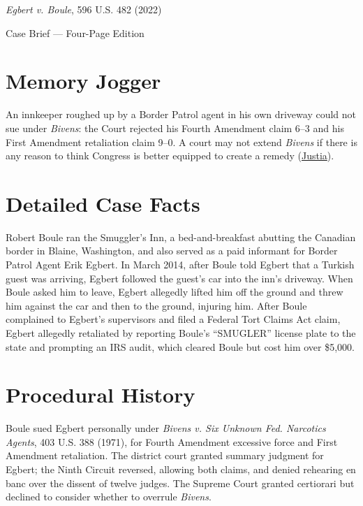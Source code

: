 \documentclass[12pt]{article}
\begin{document}
\begin{center}
{\LARGE \textit{Egbert v. Boule}, 596 U.S. 482 (2022)\par}
\vspace{0.8em}
{\large Case Brief --- Four-Page Edition\par}
\end{center}
\vspace{1em}

\section{Memory Jogger}

An innkeeper roughed up by a Border Patrol agent in his own driveway could not sue under \textit{Bivens}: the Court rejected his Fourth Amendment claim 6--3 and his First Amendment retaliation claim 9--0. A court may not extend \textit{Bivens} if there is any reason to think Congress is better equipped to create a remedy (\href{https://supreme.justia.com/cases/federal/us/596/21-147/}{Justia}).

\section{Detailed Case Facts}

Robert Boule ran the Smuggler's Inn, a bed-and-breakfast abutting the Canadian border in Blaine, Washington, and also served as a paid informant for Border Patrol Agent Erik Egbert. In March 2014, after Boule told Egbert that a Turkish guest was arriving, Egbert followed the guest's car into the inn's driveway. When Boule asked him to leave, Egbert allegedly lifted him off the ground and threw him against the car and then to the ground, injuring him. After Boule complained to Egbert's supervisors and filed a Federal Tort Claims Act claim, Egbert allegedly retaliated by reporting Boule's ``SMUGLER'' license plate to the state and prompting an IRS audit, which cleared Boule but cost him over \$5,000.

\section{Procedural History}

Boule sued Egbert personally under \textit{Bivens v. Six Unknown Fed. Narcotics Agents}, 403 U.S. 388 (1971), for Fourth Amendment excessive force and First Amendment retaliation. The district court granted summary judgment for Egbert; the Ninth Circuit reversed, allowing both claims, and denied rehearing en banc over the dissent of twelve judges. The Supreme Court granted certiorari but declined to consider whether to overrule \textit{Bivens}.
\end{document}
